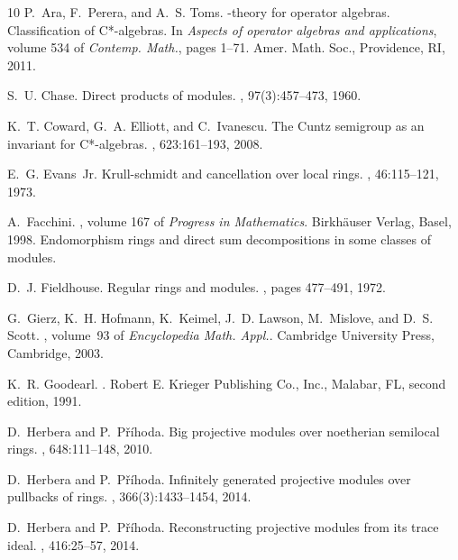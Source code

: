 \documentclass[11pt]{amsart}
\numberwithin{equation}{section}
\theoremstyle{definition}
\theoremstyle{plain}
\theoremstyle{definition}
\begin{document}
\begin{thebibliography}{10}
	P.~Ara, F.~Perera, and A.~S. Toms.
	-theory for operator algebras. {C}lassification of C*-algebras.
	\newblock In {\em Aspects of operator algebras and applications}, volume 534 of
	{\em Contemp. Math.}, pages 1--71. Amer. Math. Soc., Providence, RI, 2011.
	
	S.~U. Chase.
	\newblock Direct products of modules.
	,
	97(3):457--473, 1960.
	
	K.~T. Coward, G.~A. Elliott, and C.~Ivanescu.
	\newblock The {C}untz semigroup as an invariant for C*-algebras.
	, 623:161--193, 2008.
	
	E.~G. Evans~Jr.
	\newblock Krull-schmidt and cancellation over local rings.
	, 46:115--121, 1973.
	
	A.~Facchini.
	, volume 167 of {\em Progress in Mathematics}.
	\newblock Birkh\"auser Verlag, Basel, 1998.
	\newblock Endomorphism rings and direct sum decompositions in some classes of
	modules.
	
	D.~J. Fieldhouse.
	\newblock Regular rings and modules.
	, pages 477--491,
	1972.
	
	G.~Gierz, K.~H. Hofmann, K.~Keimel, J.~D. Lawson, M.~Mislove, and D.~S. Scott.
	, volume~93 of {\em Encyclopedia Math. Appl.}.
	\newblock Cambridge University Press, Cambridge, 2003.
	
	K.~R. Goodearl.
	.
	\newblock Robert E. Krieger Publishing Co., Inc., Malabar, FL, second edition,
	1991.
	
	D.~Herbera and P.~Př\'ihoda.
	\newblock Big projective modules over noetherian semilocal rings.
	, 648:111--148, 2010.
	
	D.~Herbera and P.~Př\'ihoda.
	\newblock Infinitely generated projective modules over pullbacks of rings.
	, 366(3):1433--1454, 2014.
	
	D.~Herbera and P.~Příhoda.
	\newblock Reconstructing projective modules from its trace ideal.
	, 416:25--57, 2014.
	

\end{thebibliography}
\end{document}
